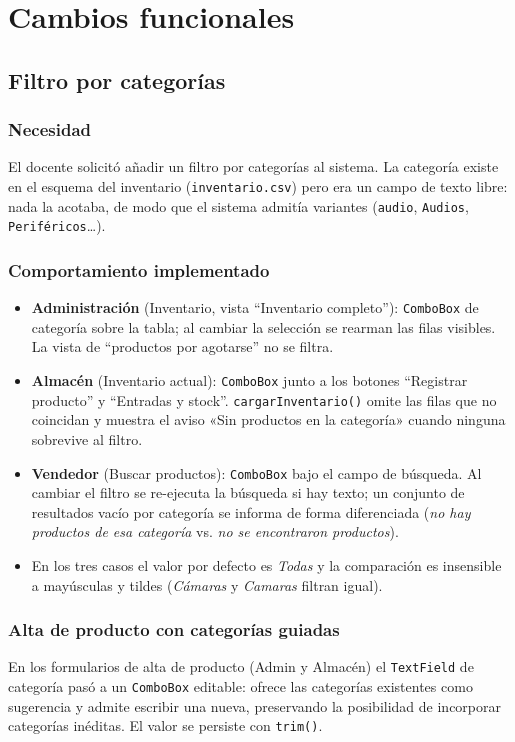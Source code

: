 \chapter{Cambios funcionales}\label{chap:cambios}

\section{Filtro por categorías}
\subsection{Necesidad}
El docente solicitó añadir un filtro por categorías al sistema. La categoría existe en el esquema del inventario (\texttt{inventario.csv}) pero era un campo de texto libre: nada la acotaba, de modo que el sistema admitía variantes (\texttt{audio}, \texttt{Audios}, \texttt{Perif\'ericos}\ldots).

\subsection{Comportamiento implementado}
\begin{itemize}
\item \textbf{Administración} (Inventario, vista ``Inventario completo''): \texttt{ComboBox} de categoría sobre la tabla; al cambiar la selección se rearman las filas visibles. La vista de ``productos por agotarse'' no se filtra.
\item \textbf{Almacén} (Inventario actual): \texttt{ComboBox} junto a los botones ``Registrar producto'' y ``Entradas y stock''. \texttt{cargarInventario()} omite las filas que no coincidan y muestra el aviso «Sin productos en la categoría» cuando ninguna sobrevive al filtro.
\item \textbf{Vendedor} (Buscar productos): \texttt{ComboBox} bajo el campo de búsqueda. Al cambiar el filtro se re-ejecuta la búsqueda si hay texto; un conjunto de resultados vacío por categoría se informa de forma diferenciada (\emph{no hay productos de esa categoría} vs. \emph{no se encontraron productos}).
\item En los tres casos el valor por defecto es \emph{Todas} y la comparación es insensible a mayúsculas y tildes (\emph{Cámaras} y \emph{Camaras} filtran igual).
\end{itemize}

\subsection{Alta de producto con categorías guiadas}
En los formularios de alta de producto (Admin y Almacén) el \texttt{TextField} de categoría pasó a un \texttt{ComboBox} editable: ofrece las categorías existentes como sugerencia y admite escribir una nueva, preservando la posibilidad de incorporar categorías inéditas. El valor se persiste con \texttt{trim()}.

